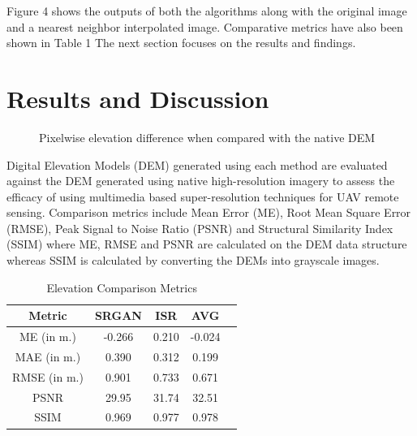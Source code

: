 \documentclass[conference]{IEEEtran}
\begin{document}
Figure 4 shows the outputs of both the algorithms along
with the original image and a nearest neighbor interpolated
image. Comparative metrics have also been shown in Table 1
The next section focuses on the results and findings.

\section{Results and Discussion}

\begin{figure}[htbp]
    \caption{Pixelwise elevation difference when compared with the native DEM}
    \label{span}
\end{figure}

Digital Elevation Models (DEM) generated using each
method are evaluated against the DEM generated using
native high-resolution imagery to assess the efficacy of
using multimedia based super-resolution techniques for
UAV remote sensing. Comparison metrics include Mean
Error (ME), Root Mean Square Error (RMSE), Peak Signal
to Noise Ratio (PSNR) and Structural Similarity Index
(SSIM) where ME, RMSE and PSNR are calculated on the
DEM data structure whereas SSIM is calculated by
converting the DEMs into grayscale images.



\setlength{\tabcolsep}{10pt} %
\renewcommand{\arraystretch}{1.5} %
\begin{table}[h!]
    \caption{Elevation Comparison Metrics}
    \centering
     \begin{tabular}{ c c c c c } 
     \hline
     Metric & SRGAN & ISR & AVG \\ [1ex] 
     \hline
     ME (in m.) & -0.266 & 0.210 & -0.024 \\ 
     MAE (in m.) & 0.390 & 0.312 & 0.199 \\ 
     RMSE (in m.) & 0.901 & 0.733 & 0.671 \\
     PSNR & 29.95 & 31.74 & 32.51 \\
     SSIM & 0.969 & 0.977 & 0.978 \\
     \hline
     \end{tabular}
\end{table}
\end{document}
